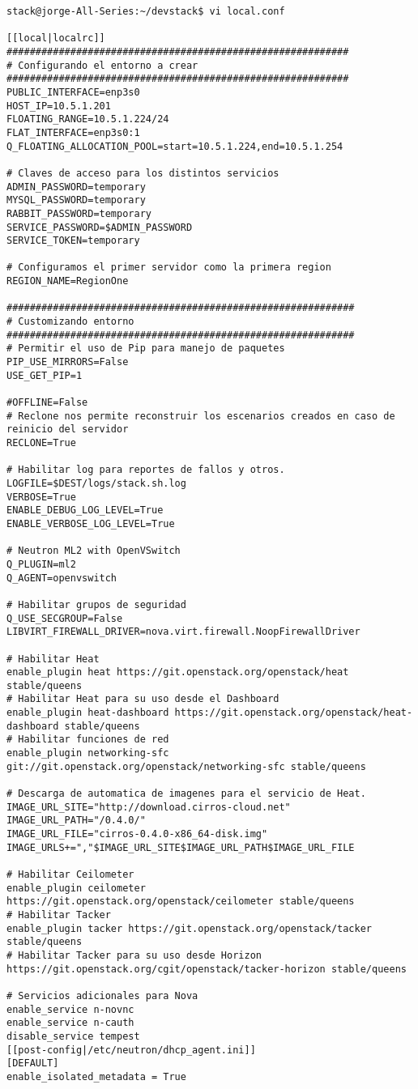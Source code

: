 \begin{lstlisting}[style=Consola]
stack@jorge-All-Series:~/devstack$ vi local.conf

[[local|localrc]]
###########################################################
# Configurando el entorno a crear
###########################################################
PUBLIC_INTERFACE=enp3s0
HOST_IP=10.5.1.201
FLOATING_RANGE=10.5.1.224/24
FLAT_INTERFACE=enp3s0:1
Q_FLOATING_ALLOCATION_POOL=start=10.5.1.224,end=10.5.1.254

# Claves de acceso para los distintos servicios
ADMIN_PASSWORD=temporary
MYSQL_PASSWORD=temporary
RABBIT_PASSWORD=temporary
SERVICE_PASSWORD=$ADMIN_PASSWORD
SERVICE_TOKEN=temporary

# Configuramos el primer servidor como la primera region
REGION_NAME=RegionOne

############################################################
# Customizando entorno
############################################################
# Permitir el uso de Pip para manejo de paquetes
PIP_USE_MIRRORS=False
USE_GET_PIP=1

#OFFLINE=False
# Reclone nos permite reconstruir los escenarios creados en caso de reinicio del servidor
RECLONE=True

# Habilitar log para reportes de fallos y otros.
LOGFILE=$DEST/logs/stack.sh.log
VERBOSE=True
ENABLE_DEBUG_LOG_LEVEL=True
ENABLE_VERBOSE_LOG_LEVEL=True

# Neutron ML2 with OpenVSwitch
Q_PLUGIN=ml2
Q_AGENT=openvswitch

# Habilitar grupos de seguridad
Q_USE_SECGROUP=False
LIBVIRT_FIREWALL_DRIVER=nova.virt.firewall.NoopFirewallDriver

# Habilitar Heat
enable_plugin heat https://git.openstack.org/openstack/heat stable/queens
# Habilitar Heat para su uso desde el Dashboard
enable_plugin heat-dashboard https://git.openstack.org/openstack/heat-dashboard stable/queens
# Habilitar funciones de red
enable_plugin networking-sfc git://git.openstack.org/openstack/networking-sfc stable/queens

# Descarga de automatica de imagenes para el servicio de Heat.
IMAGE_URL_SITE="http://download.cirros-cloud.net"
IMAGE_URL_PATH="/0.4.0/"
IMAGE_URL_FILE="cirros-0.4.0-x86_64-disk.img"
IMAGE_URLS+=","$IMAGE_URL_SITE$IMAGE_URL_PATH$IMAGE_URL_FILE

# Habilitar Ceilometer
enable_plugin ceilometer https://git.openstack.org/openstack/ceilometer stable/queens
# Habilitar Tacker
enable_plugin tacker https://git.openstack.org/openstack/tacker stable/queens
# Habilitar Tacker para su uso desde Horizon
https://git.openstack.org/cgit/openstack/tacker-horizon stable/queens

# Servicios adicionales para Nova
enable_service n-novnc
enable_service n-cauth
disable_service tempest
[[post-config|/etc/neutron/dhcp_agent.ini]]
[DEFAULT]
enable_isolated_metadata = True
\end{lstlisting}

